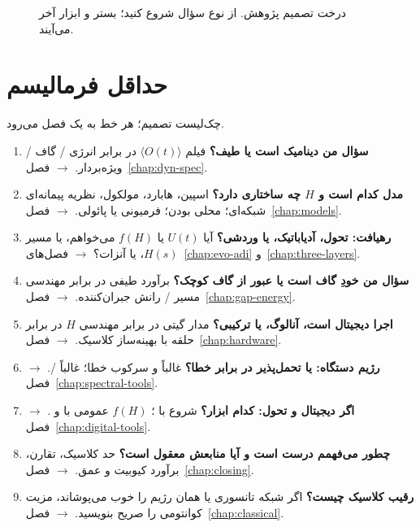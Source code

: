 \begin{figure}[htbp]
	\centering
	\begin{latin}
		\resizebox{\ifdim\width>\textwidth\textwidth\else\width\fi}{!}{%
		}
	\end{latin}
	\caption{درخت تصمیم پژوهش. از نوع سؤال شروع کنید؛ بستر و ابزار آخر می‌آیند.}
	\label{fig:compass}
\end{figure}

\section{حداقل فرمالیسم}

چک‌لیست تصمیم؛ هر خط به یک فصل می‌رود.
\begin{enumerate}
	\item \textbf{سؤال من دینامیک است یا طیف؟}
	فیلم $\langle O(t)\rangle$ در برابر انرژی / گاف / ویژه‌بردار.
	$\to$ فصل~\ref{chap:dyn-spec}.
	\item \textbf{مدل کدام است و $H$ چه ساختاری دارد؟}
	اسپین، هابارد، مولکول، نظریه پیمانه‌ای شبکه‌ای؛ محلی بودن؛ فرمیونی یا پائولی.
	$\to$ فصل~\ref{chap:models}.
	\item \textbf{رهیافت: تحول، آدیاباتیک، یا وردشی؟}
	آیا $U(t)$ یا $f(H)$ می‌خواهم، یا مسیر $H(s)$، یا آنزات؟
	$\to$ فصل‌های~\ref{chap:evo-adi} و~\ref{chap:three-layers}.
	\item \textbf{سؤال من خودِ گاف است یا عبور از گاف کوچک؟}
	برآورد طیفی در برابر مهندسی مسیر / رانش جبران‌کننده.
	$\to$ فصل~\ref{chap:gap-energy}.
	\item \textbf{اجرا دیجیتال است، آنالوگ، یا ترکیبی؟}
	مدار گیتی در برابر مهندسی $H$ در برابر حلقه با بهینه‌ساز کلاسیک.
	$\to$ فصل~\ref{chap:hardware}.
	\item \textbf{رژیم دستگاه:  یا تحمل‌پذیر در برابر خطا؟}
	 غالباً  و سرکوب خطا؛  غالباً /.
	$\to$ فصل~\ref{chap:spectral-tools}.
	\item \textbf{اگر دیجیتال و تحول: کدام ابزار؟}
	شروع با ؛ $f(H)$ عمومی با  و .
	$\to$ فصل~\ref{chap:digital-tools}.
	\item \textbf{چطور می‌فهمم درست است و آیا منابعش معقول است؟}
	حد کلاسیک، تقارن، برآورد کیوبیت و عمق.
	$\to$ فصل~\ref{chap:closing}.
	\item \textbf{رقیب کلاسیک چیست؟}
	اگر شبکه تانسوری یا  همان رژیم را خوب می‌پوشاند، مزیت کوانتومی را صریح بنویسید.
	$\to$ فصل~\ref{chap:classical}.
\end{enumerate}

